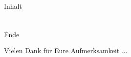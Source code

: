\documentclass[12pt,hyperref={pdfpagelabels=false},notes=show,aspectratio=169]{beamer}
\begin{document}

\begin{frame}{Inhalt}
    \hspace{0.1\textwidth}
    \parbox[c][0.8\textheight][s]{0.8\textwidth}{
        \tableofcontents
    }
\end{frame}








\section*{}
\begin{frame}{Ende}
    \begin{center}
        Vielen Dank für Eure Aufmerksamkeit	...
     \end{center}
\end{frame}\addtocounter{framenumber}{-1}
	
\end{document}
